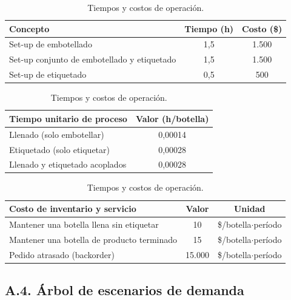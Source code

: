 \begin{table}[h]
  \centering
  \begin{tabular}{lcc}
    \toprule
    \textbf{Concepto} & \textbf{Tiempo (h)} & \textbf{Costo (\$)} \\
    \midrule
    Set-up de embotellado                        & 1,5 & 1.500 \\
    Set-up conjunto de embotellado y etiquetado  & 1,5 & 1.500 \\
    Set-up de etiquetado                          & 0,5 & 500   \\
    \bottomrule
  \end{tabular}
  \vspace{0.6em}

  \begin{tabular}{lc}
    \toprule
    \textbf{Tiempo unitario de proceso} & \textbf{Valor (h/botella)} \\
    \midrule
    Llenado (solo embotellar)              & 0,00014 \\
    Etiquetado (solo etiquetar)            & 0,00028 \\
    Llenado y etiquetado acoplados         & 0,00028 \\
    \bottomrule
  \end{tabular}
  \vspace{0.6em}

  \begin{tabular}{lcc}
    \toprule
    \textbf{Costo de inventario y servicio} & \textbf{Valor} & \textbf{Unidad} \\
    \midrule
    Mantener una botella llena sin etiquetar     & 10     & \$/botella$\cdot$período \\
    Mantener una botella de producto terminado   & 15     & \$/botella$\cdot$período \\
    Pedido atrasado (backorder)                  & 15.000 & \$/botella$\cdot$período \\
    \bottomrule
  \end{tabular}
  \caption{Tiempos y costos de operación.}
  \label{tab:anexoA-costos}
\end{table}

\subsection*{A.4. Árbol de escenarios de demanda}

